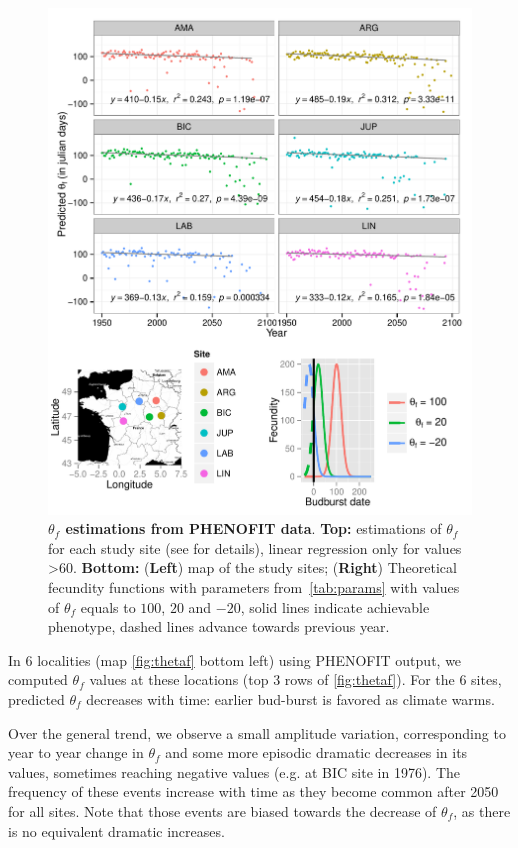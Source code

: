 \begin{figure}[ht!]
	\centering
	\includegraphics[scale=1]{Figures/optsmaps.pdf}
	\caption{\textbf{$\theta_{f}$ estimations from PHENOFIT data}. \textbf{Top:} estimations of $\theta_f$ for each study site (see  for details), linear regression only for values >60. \textbf{Bottom:} (\textbf{Left}) map of the study sites; (\textbf{Right}) Theoretical fecundity functions with parameters from~\autoref{tab:params} with values of $\theta_f$ equals to $100$, $20$ and $-20$, solid lines indicate achievable phenotype, dashed lines advance towards previous year.}
	\label{fig:thetaf}
\end{figure}

In 6 localities (map \autoref{fig:thetaf} bottom left) using \textsc{PHENOFIT} output, we computed $\theta_f$ values at these locations (top 3 rows of \autoref{fig:thetaf}). For the 6 sites, predicted $\theta_f$ decreases with time: earlier bud-burst is favored as climate warms.

Over the general trend, we observe a small amplitude variation, corresponding to year to year change in $\theta_f$ and some more episodic dramatic decreases in its values, sometimes reaching negative values (e.g. at BIC site in 1976). The frequency of these events increase with time as they become common after 2050 for all sites. Note that those events are biased towards the decrease of $\theta_f$, as there is no equivalent dramatic increases.

